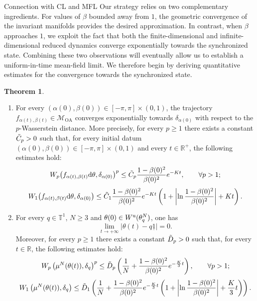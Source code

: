 \documentclass{article}
\theoremstyle{definition}
\newtheorem{theorem}[definition]{Theorem}
\newcommand{\R}{\mathbb{R}}
\newcommand{\T}{\mathbb{T}}
\renewcommand{\u}{\textnormal{u}}
\renewcommand{\d}{\textnormal{d}}
\newcommand{\OA}{\mathcal{M}_{\mathrm{OA}}}
\begin{document}
\begin{section}{Connection with CL and MFL}
Our strategy relies on two complementary ingredients. For values of $\beta$ bounded away from $1$, the geometric convergence of the invariant manifolds provides the desired approximation. In contrast, when $\beta$ approaches $1$, we exploit the fact that both the finite-dimensional and infinite-dimensional reduced dynamics converge exponentially towards the synchronized state. Combining these two observations will eventually allow us to establish a uniform-in-time mean-field limit. We therefore begin by deriving quantitative estimates for the convergence towards the synchronized state.
\begin{theorem}\label{conv_rate_synchro}
\begin{enumerate} 
\item[i)] For every $(\alpha(0),\beta(0))\in[-\pi,\pi]\times(0,1)$, the trajectory $f_{\alpha(t),\beta(t)}\in\OA$ converges exponentially towards $\delta_{\alpha(0)}$ with respect to the $p$-Wasserstein distance. More precisely, for every $p\geq1$ there exists a constant $\Tilde{C}_p>0$ such that, for every initial datum $(\alpha(0),\beta(0))\in[-\pi,\pi]\times(0,1)$ and every $t\in\R^+$, the following estimates hold:
\begin{equation} W_p\big(f_{\alpha(t),\beta(t)}\d\theta,\delta_{\alpha(0)}\big)^p \leq \Tilde{C}_p\frac{1-\beta(0)^2}{\beta(0)^2} e^{-Kt}, \qquad \forall p>1; \end{equation} 
\begin{equation} W_1\big(f_{\alpha(t),\beta(t)}\d\theta,\delta_{\alpha(0)}\big) \leq \Tilde{C}_1 \frac{1-\beta(0)^2}{\beta(0)^2} e^{-Kt} \left( 1+\left|\ln\frac{1-\beta(0)^2}{\beta(0)^2}\right|+Kt \right). 
\end{equation} 
\item[ii)] For every $q\in\T^1$, $N\geq3$ and $\theta(0)\in W^\u(\theta^N_q)$, one has \[ \lim_{t\rightarrow+\infty}|\theta(t)-q\underline{1}|=0. \] Moreover, for every $p\geq1$ there exists a constant $\Tilde{D}_p>0$ such that, for every $t\in\R$, the following estimates hold:
\begin{equation} W_p\left(\mu^N(\theta(t)),\delta_{q}\right)^p \leq \Tilde{D}_p \left( \frac{1}{N} + \frac{1-\beta(0)^2}{\beta(0)^2} e^{-\frac{K}{3}t} \right), \qquad \forall p>1; \end{equation}
\begin{equation} W_1\left(\mu^N(\theta(t)),\delta_{q}\right) \leq \Tilde{D}_1 \left( \frac{1}{N} + \frac{1-\beta(0)^2}{\beta(0)^2} e^{-\frac{K}{3}t} \left( 1+\left|\ln \frac{1-\beta(0)^2}{\beta(0)^2}\right| +\frac{K}{3}t \right) \right).

\end{equation}
\end{enumerate}
\end{theorem}
\end{section}
\end{document}
